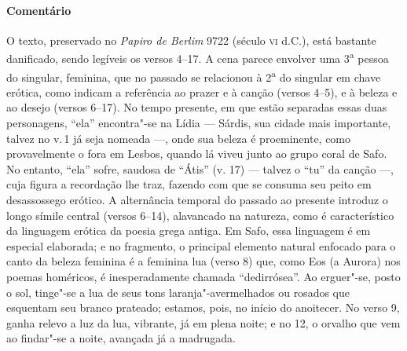 {{\paragraph{Comentário} O texto, preservado no \textit{Papiro de Berlim} 9722 (século \textsc{vi}
d.C.), está bastante danificado, sendo legíveis os versos 4--17.
A cena parece envolver uma 3\textsuperscript{a} pessoa do
singular, feminina, que no passado se relacionou à 2\textsuperscript{a} do
singular em chave erótica, como indicam a referência ao prazer e à canção		
(versos 4--5), e à beleza e ao desejo (versos 6--17). No tempo presente, 
em que estão separadas essas duas personagens, ``ela” encontra"-se na Lídia --- Sárdis, sua cidade mais importante, talvez no v.\,1 já seja nomeada ---, onde sua beleza é proeminente, como provavelmente o fora em Lesbos, quando lá viveu junto ao grupo coral de Safo. No entanto, ``ela” sofre, saudosa de ``Átis” (v.
17) --- talvez o ``tu” da canção ---, cuja figura a recordação lhe traz, fazendo
com que se consuma seu peito em desassossego erótico. A alternância temporal do
passado ao presente introduz o longo símile central (versos 6--14), alavancado
na natureza, como é característico da linguagem erótica da poesia grega antiga.
Em Safo, essa linguagem é em especial elaborada; e no fragmento, o principal
elemento natural enfocado para o canto da beleza feminina é a feminina lua
(verso 8) que, como Eos (a Aurora) nos poemas homéricos, é inesperadamente
chamada ``dedirrósea”. Ao erguer"-se, posto o sol, tinge"-se a lua
de seus tons laranja"-avermelhados ou rosados que esquentam seu branco prateado;
estamos, pois, no início do anoitecer. No verso 9, ganha relevo a luz da lua,
vibrante, já em plena noite; e no 12, o orvalho que vem ao findar"-se a noite,
avançada já a madrugada.

}}
